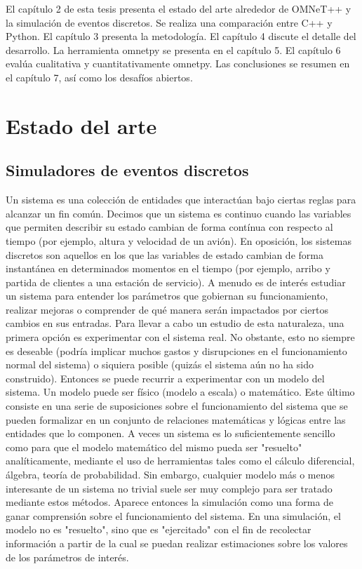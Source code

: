 \documentclass[]{article}
\begin{document}
El capítulo 2 de esta tesis presenta el estado del arte alrededor de OMNeT++ y
la simulación de eventos discretos. Se realiza una comparación entre C++ y
Python. El capítulo 3 presenta la metodología. El capítulo 4 discute el detalle
del desarrollo. La herramienta omnetpy se presenta en el capítulo 5. El
capítulo 6 evalúa cualitativa y cuantitativamente omnetpy. Las conclusiones se
resumen en el capítulo 7, así como los desafíos abiertos.

\section{Estado del arte}

\subsection{Simuladores de eventos discretos}

Un sistema es una colección de entidades que interactúan bajo ciertas reglas
para alcanzar un fin común. Decimos que un sistema es continuo cuando las
variables que permiten describir su estado cambian de forma contínua con
respecto al tiempo (por ejemplo, altura y velocidad de un avión). En oposición,
los sistemas discretos son aquellos en los que las variables de estado cambian
de forma instantánea en determinados momentos en el tiempo (por ejemplo, arribo
y partida de clientes a una estación de servicio).  A menudo es de interés
estudiar un sistema para entender los parámetros que gobiernan su
funcionamiento, realizar mejoras o comprender de qué manera serán impactados
por ciertos cambios en sus entradas.  Para llevar a cabo un estudio de esta
naturaleza, una primera opción es experimentar con el sistema real. No
obstante, esto no siempre es deseable (podría implicar muchos gastos y
disrupciones en el funcionamiento normal del sistema) o siquiera posible
(quizás el sistema aún no ha sido construido). Entonces se puede recurrir a
experimentar con un modelo del sistema.  Un modelo puede ser físico (modelo a
escala) o matemático. Este último consiste en una serie de suposiciones sobre
el funcionamiento del sistema que se pueden formalizar en un conjunto de
relaciones matemáticas y lógicas entre las entidades que lo componen.  A veces
un sistema es lo suficientemente sencillo como para que el modelo matemático
del mismo pueda ser "resuelto" analíticamente, mediante el uso de herramientas
tales como el cálculo diferencial, álgebra, teoría de probabilidad. Sin
embargo, cualquier modelo más o menos interesante de un sistema no trivial
suele ser muy complejo para ser tratado mediante estos métodos.  Aparece
entonces la simulación como una forma de ganar comprensión sobre el
funcionamiento del sistema. En una simulación, el modelo no es "resuelto", sino
que es "ejercitado" con el fin de recolectar información a partir de la cual se
puedan realizar estimaciones sobre los valores de los parámetros de interés.
\end{document}
